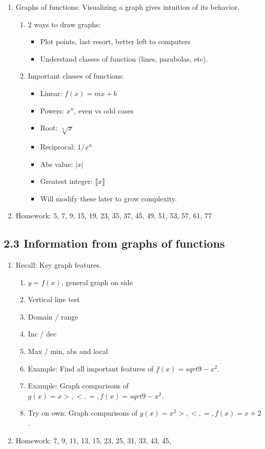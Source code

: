 \documentclass{article}
\begin{document}
\begin{enumerate}
\item Graphs of functions: Visualizing a graph gives intuition of its behavior.
\begin{enumerate}
\item 2 ways to draw graphs:
\begin{itemize}
\item Plot points, last resort, better left to computers
\item Understand classes of function (lines, parabolas, etc).
\end{itemize}
\item Important classes of functions:
\begin{itemize}
\item Linear: $f(x)=mx+b$
\item Powers: $x^n$, even vs odd cases
\item Root: $\sqrt[n]{x}$
\item Reciprocal: $1/x^n$
\item Abs value: $|x|$
\item Greatest integer: $\llbracket x \rrbracket$
\item Will modify these later to grow complexity.
\end{itemize}
\end{enumerate}

\item Homework: 5, 7, 9, 15, 19, 23, 35, 37, 45, 49, 51, 53, 57, 61, 77

\end{enumerate}


\subsection{2.3 Information from graphs of functions}

\begin{enumerate}

\item Recall: Key graph features.
\begin{enumerate}
\item $y=f(x)$, general graph on side
\item Vertical line test
\item Domain / range
\item Inc / dec
\item Max / min, abs and local
\item Example: Find all important features of $f(x) = sqrt{9-x^2}$.
\item Example: Graph comparisons of $g(x)=x > , <, =, f(x)=sqrt{9-x^2}$.
\item Try on own: Graph comparisons of $g(x)=x^2 > , <, =, f(x)=x+2$.
\end{enumerate} 

\item Homework: 7, 9, 11, 13, 15, 23, 25, 31, 33, 43, 45, 





\end{enumerate}
\end{document}
